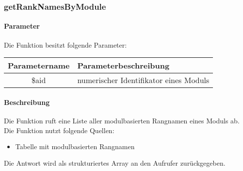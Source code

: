 \subsubsection{getRankNamesByModule}
\paragraph{Parameter} Die Funktion besitzt folgende Parameter:
\begin{table}[H]
	\begin{tabular}{|c|p{11cm}|}
		\hline
		\textbf{Parametername} & \textbf{Parameterbeschreibung} \\ \hline
		\$aid & numerischer Identifikator eines Moduls \\ \hline
	\end{tabular}
\end{table}
\paragraph{Beschreibung} Die Funktion ruft eine Liste aller modulbasierten Rangnamen eines Moduls ab. Die Funktion nutzt folgende Quellen:
\begin{itemize}
	\item Tabelle mit modulbasierten Rangnamen
\end{itemize}
Die Antwort wird als strukturiertes Array an den Aufrufer zurückgegeben.